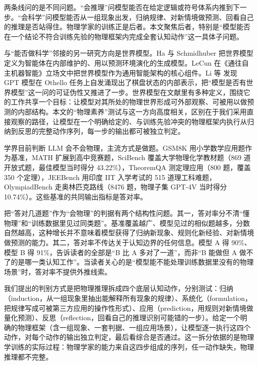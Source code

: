 \documentclass[11pt]{article}
\begin{document}
两条线问的是不同问题。“会推理”问模型能否在给定逻辑或符号体系内推到下一步。“会科学”问模型能否从一组现象出发，归纳规律、对新情境做预测、回看自己的推理是否站得住。物理学家的训练正是后者。本文聚焦后者，特别是“模型能否在一个结论不符合训练先验的物理框架内完成全套认知动作”这一具体子问题。

与“能否做科学”邻接的另一研究方向是世界模型。Ha 与 Schmidhuber\citep{ha2018world} 把世界模型定义为智能体在内部维护的、用以预测环境演化的生成模型。LeCun\citep{lecun2022path} 在《通往自主机器智能》立场文中把世界模型作为通用智能架构的核心组件。Li 等\citep{li2023emergent} 发现 GPT 模型在 Othello 任务上自发涌现出了棋盘状态的内部表示，把“模型是否有世界模型”这一问的可证伪性又推进了一步。世界模型在文献里有多种定义，围绕它的工作共享一个目标：让模型对其所处的物理世界形成可外部观察、可被用以做预测的内部结构。本文的“物理素养”测试与这一方向高度相关，区别在于我们采用直接观察的路径，让模型在一个明确给定的、与训练先验冲突的物理框架内执行从归纳到反思的完整动作序列，每一步的输出都可被独立判定。

学界目前判断 LLM 会不会物理，主流方式是做题。GSM8K\citep{cobbe2021training} 用小学数学应用题作为基准，MATH\citep{hendrycks2021measuring} 扩展到高中竞赛题，SciBench\citep{wang2024scibench} 覆盖大学物理化学教材题（869 道开放式题，最佳模型当时得分 43.22\%），TheoremQA\citep{chen2023theoremqa} 测定理应用（800 题，覆盖 350 个定理），JEEBench\citep{arora2023llms} 用印度 IIT 入学考试的 515 道理工科难题，OlympiadBench\citep{he2024olympiadbench} 走奥林匹克路线（8476 题，物理子集 GPT-4V 当时得分 10.74\%）。这些基准的共同输出指标是答对率。

把“答对几道题”作为“会物理”的判据有两个结构性问题。其一，答对率分不清“懂物理”和“训练数据里见过同类题”。基准覆盖越广、模型见过的相似题越多，分数自然越高，这种增长并不意味着模型获得了归纳新现象、规则化新经验、对新情境做预测的能力。其二，答对率不传达关于认知边界的任何信息。模型 A 得 90\%、模型 B 得 91\%，告诉读者的全部是“B 比 A 多对了一道”，而非“B 能做但 A 做不了的是哪一类认知工作”。当读者关心的是“模型能不能处理训练数据里没有的物理场景”时，答对率不提供外推线索。

我们提出的判别方式是把物理推理拆成四个底层认知动作，分别测试：归纳（induction，从一组现象里抽出能解释所有现象的规律）、系统化（formulation，把规律写成可被第三方应用的操作性形式）、应用（prediction，用规则对新情境做量化预测）、反思（reflection，回看自己的推理识别可能错的一步）。给定一个明确的物理框架（含一组现象、一套判据、一组应用场景），让模型逐一执行这四个动作，对每个动作的输出独立判定，最后看综合是否通过。这一拆分依据的是物理学训练的实际过程：物理学家的能力来自这四步组成的序列，任一动作缺失，物理推理都不完整。
\end{document}
